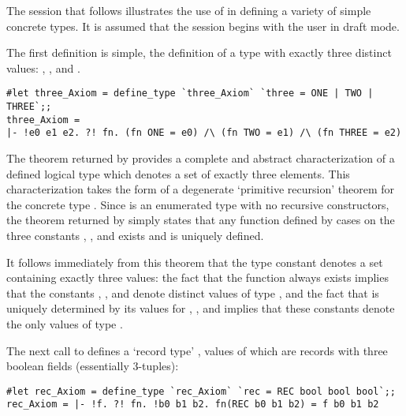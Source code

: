 The session that follows illustrates the use of  in defining
a variety of simple concrete types.  It is assumed that the session begins
with the user in draft mode.

The first definition is simple, the definition of a type  with
exactly three distinct values: , , and .

\setcounter{sessioncount}{1}\label{types-session}
\begin{session}\begin{verbatim}
#let three_Axiom = define_type `three_Axiom` `three = ONE | TWO | THREE`;;
three_Axiom =
|- !e0 e1 e2. ?! fn. (fn ONE = e0) /\ (fn TWO = e1) /\ (fn THREE = e2)
\end{verbatim}\end{session}

\noindent The theorem returned by  provides a complete
and abstract characterization of
a defined logical type  which denotes a set of
exactly three elements.  This characterization takes the form of a
degenerate `primitive recursion'
 theorem for the concrete type .
Since  is an enumerated type with no recursive constructors,
the theorem returned by  simply
states that any function defined by cases on the three constants  ,
, and  exists and is uniquely defined.

It follows immediately from this theorem that the type constant 
denotes a set containing exactly three values: the fact that the function
 always exists implies that the constants , , and
 denote distinct values of type , and the fact that 
is uniquely determined by its values for , , and 
implies that these constants denote the only values of type .

The next call to  defines a `record type' , values of
which are records with three boolean fields (essentially 3-tuples):

\begin{session}\begin{verbatim}
#let rec_Axiom = define_type `rec_Axiom` `rec = REC bool bool bool`;;
rec_Axiom = |- !f. ?! fn. !b0 b1 b2. fn(REC b0 b1 b2) = f b0 b1 b2
\end{verbatim}\end{session}\label{rec-def}

